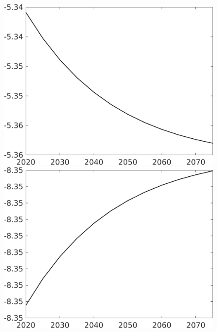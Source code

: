 \documentclass[12pt]{article}
\begin{document}
\begin{figure}[h!!]
\begin{minipage}[]{0.32\textwidth}
	\end{minipage}	
\begin{minipage}[]{0.32\textwidth}
\includegraphics[width=1\textwidth]{../../codding_model/own_basedOnFried/optimalPol_010922_revision/figures/all_13Sept22/CompTaul_Equlab_LFBAUPer_Reg0_hl_spillover0_nsk0_xgr1_knspil1_sep1_countec0_GovRev0_etaa0.79.png}
\end{minipage}	
	\begin{minipage}[]{0.32\textwidth}
		\includegraphics[width=1\textwidth]{../../codding_model/own_basedOnFried/optimalPol_010922_revision/figures/all_13Sept22/CompTaul_Equlab_LFBAUPer_Reg0_C_spillover0_nsk0_xgr1_knspil1_sep1_countec0_GovRev0_etaa0.79.png}

\end{minipage}
\end{figure}
\end{document}
